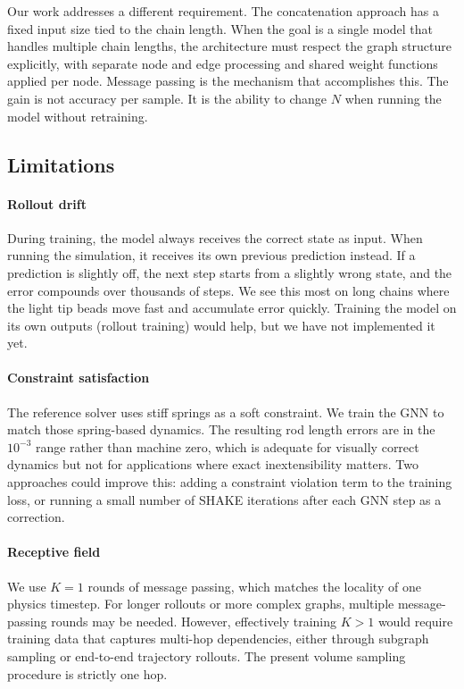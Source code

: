 \documentclass[conference]{IEEEtran}
\begin{document}
Our work addresses a different requirement. The concatenation approach has a fixed input size tied to the chain length. When the goal is a single model that handles multiple chain lengths, the architecture must respect the graph structure explicitly, with separate node and edge processing and shared weight functions applied per node. Message passing is the mechanism that accomplishes this. The gain is not accuracy per sample. It is the ability to change $N$ when running the model without retraining.

\subsection{Limitations}

\paragraph{Rollout drift} During training, the model always receives the correct state as input. When running the simulation, it receives its own previous prediction instead. If a prediction is slightly off, the next step starts from a slightly wrong state, and the error compounds over thousands of steps. We see this most on long chains where the light tip beads move fast and accumulate error quickly. Training the model on its own outputs (rollout training) would help, but we have not implemented it yet.

\paragraph{Constraint satisfaction} The reference solver uses stiff springs as a soft constraint. We train the GNN to match those spring-based dynamics. The resulting rod length errors are in the $10^{-3}$ range rather than machine zero, which is adequate for visually correct dynamics but not for applications where exact inextensibility matters. Two approaches could improve this: adding a constraint violation term to the training loss, or running a small number of SHAKE iterations after each GNN step as a correction.

\paragraph{Receptive field} We use $K=1$ rounds of message passing, which matches the locality of one physics timestep. For longer rollouts or more complex graphs, multiple message-passing rounds may be needed. However, effectively training $K>1$ would require training data that captures multi-hop dependencies, either through subgraph sampling or end-to-end trajectory rollouts. The present volume sampling procedure is strictly one hop.
\end{document}

